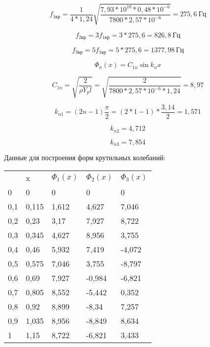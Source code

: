 \[f_{1кр} = \frac{1}{4*1,24}\sqrt{\frac{7,93*10^{10}*0,48*10^{- 6}}{7800*2,57*10^{- 6}}} = 275,6\ Гц\]

\[f_{2кр} = 3f_{1кр} = 3*275,6 = 826,8\ Гц\]

\[f_{3кр} = 5f_{1кр} = 5*275,6 = 1377,98\ Гц\]

\[\Phi_{n}(x) = C_{1n}\sin k_{n}x\]

\[C_{1n} = \sqrt{\frac{2}{\rho Y_{p}l}} = \sqrt{\frac{2}{7800*2,57*10^{- 6}*1,24}} = 8,97\]

\[k_{n1} = \left( 2n - 1 \right)\frac{\pi}{2} = \left( 2*1 - 1 \right)*\frac{3,14}{2} = 1,571\]

\[k_{n2} = 4,712\]

\[k_{n3} = 7,854\]

Данные для построения форм крутильных колебаний:

\begin{longtable}{@{}lllll@{}}
& x & \(\Phi_{1}(x)\) & \(\Phi_{2}(x)\) & \(\Phi_{3}(x)\)\\
0 & 0 & 0 & 0 & 0\\
0,1 & 0,115 & 1,612 & 4,627 & 7,046\\
0,2 & 0,23 & 3,17 & 7,927 & 8,722\\
0,3 & 0,345 & 4,627 & 8,956 & 3,755\\
0,4 & 0,46 & 5,932 & 7,419 & -4,072\\
0,5 & 0,575 & 7,046 & 3,755 & -8,797\\
0,6 & 0,69 & 7,927 & -0,984 & -6,821\\
0,7 & 0,805 & 8,552 & -5,442 & 0,352\\
0,8 & 0,92 & 8,899 & -8,34 & 7,257\\
0,9 & 1,035 & 8,956 & -8,849 & 8,634\\
1 & 1,15 & 8,722 & -6,821 & 3,433\\
\end{longtable}


